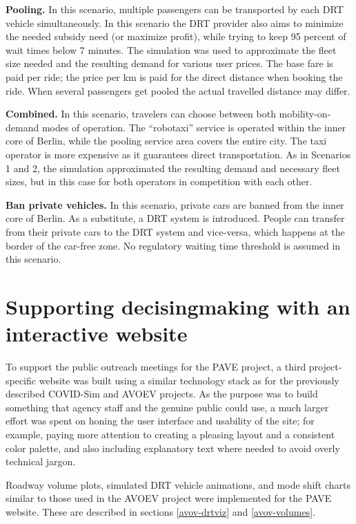 \textbf{Pooling.} In this scenario, multiple passengers can be transported by each DRT vehicle simultaneously. In this scenario the DRT provider also aims to minimize the needed subsidy need (or maximize profit),  while trying to keep 95 percent of wait times below 7 minutes. The simulation was used to approximate the fleet size needed and the resulting demand for various user prices. The base fare is paid per ride; the price per km is paid for the direct distance when booking the ride. When several passengers get pooled the actual travelled distance may differ.

\textbf{Combined.} In this scenario, travelers can choose between both mobility-on-demand modes of operation. The ``robotaxi'' service is operated within the inner core of Berlin, while the pooling service area covers the entire city. The taxi operator is more expensive as it guarantees direct transportation. As in Scenarios 1 and 2, the simulation approximated the resulting demand and necessary fleet sizes, but in this case for both operators in competition with each other.

\textbf{Ban private vehicles.} In this scenario, private cars are banned from the inner core of Berlin. As a substitute, a DRT system is introduced. People can transfer from their private cars to the DRT system and vice-versa, which happens at the border of the car-free zone. No regulatory waiting time threshold is assumed in this scenario.

\section{Supporting decisingmaking with an interactive website}
\label{pave-site-features}

To support the public outreach meetings for the PAVE project, a third project-specific website was built using a similar technology stack as for the previously described COVID-Sim and AVOEV projects. As the purpose was to build something that agency staff and the genuine public could use, a much larger effort was spent on honing the user interface and usability of the site; for example, paying more attention to creating a pleasing layout and a consistent color palette, and also including explanatory text where needed to avoid overly technical jargon.

Roadway volume plots, simulated DRT vehicle animations, and mode shift charts similar to those used in the AVOEV project were implemented for the PAVE website. These are described in sections \ref{avov-drtviz} and \ref{avov-volumes}.

